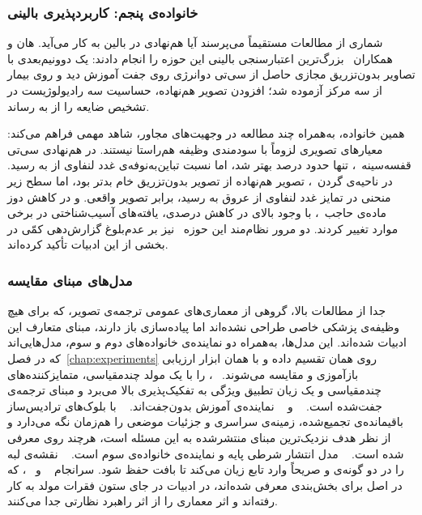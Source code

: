 \subsubsection*{خانواده‌ی پنجم: کاربردپذیری بالینی}

شماری از مطالعات مستقیماً می‌پرسند آیا هم‌نهادی در بالین به کار می‌آید. هان و همکاران~\cite{Han24} بزرگ‌ترین اعتبارسنجی بالینی این حوزه را انجام دادند: یک  دوونیم‌بعدی با تصاویر بدون‌تزریق مجازی حاصل از سی‌تی دوانرژی روی  جفت آموزش دید و روی  بیمار از سه مرکز آزموده شد؛ افزودن تصویر هم‌نهاده، حساسیت سه رادیولوژیست در تشخیص ضایعه را از  به  رساند.

همین خانواده، به‌همراه چند مطالعه در وجهیت‌های مجاور، شاهد مهمی فراهم می‌کند: معیارهای تصویری لزوماً با سودمندی وظیفه هم‌راستا نیستند. در هم‌نهادی سی‌تی قفسه‌سینه~\cite{Cho21}،  تنها حدود  درصد بهتر شد، اما نسبت تباین‌به‌نوفه‌ی غدد لنفاوی از  به  رسید. در ناحیه‌ی گردن~\cite{Fuk24}،  تصویر هم‌نهاده از تصویر بدون‌تزریق خام بدتر بود، اما سطح زیر منحنی در تمایز غدد لنفاوی از عروق به  رسید، برابر تصویر واقعی. و در کاهش دوز ماده‌ی حاجب~\cite{Hau21}، با وجود  بالای  در کاهش  درصدی، یافته‌های آسیب‌شناختی در برخی موارد تغییر کردند. دو مرور نظام‌مند این حوزه~\cite{Aza23,Jo26} نیز بر عدم‌بلوغ گزارش‌دهی کمّی در بخشی از این ادبیات تأکید کرده‌اند.


\subsubsection*{مدل‌های مبنای مقایسه}

جدا از مطالعات بالا، گروهی از معماری‌های عمومی ترجمه‌ی تصویر، که برای هیچ وظیفه‌ی پزشکی خاصی طراحی نشده‌اند اما پیاده‌سازی باز دارند، مبنای متعارف این ادبیات شده‌اند. این مدل‌ها، به‌همراه دو نماینده‌ی خانواده‌های دوم و سوم، مدل‌هایی‌اند که در فصل~\ref{chap:experiments} روی همان تقسیم داده و با همان ابزار ارزیابی بازآموزی و مقایسه می‌شوند. ~\cite{wang2018pix2pixhd}،  را با یک مولد چندمقیاسی، متمایزکننده‌های چندمقیاسی و یک زیان تطبیق ویژگی به تفکیک‌پذیری بالا می‌برد و مبنای ترجمه‌ی جفت‌شده است. ~\cite{zhu2017unpaired} و ~\cite{Ris21} نماینده‌ی آموزش بدون‌جفت‌اند. ~\cite{dalmaz2022resvit} با بلوک‌های ترادیس‌ساز باقیمانده‌ی تجمیع‌شده، زمینه‌ی سراسری و جزئیات موضعی را هم‌زمان نگه می‌دارد و از نظر هدف نزدیک‌ترین مبنای منتشرشده به این مسئله است، هرچند روی  معرفی شده است. ~\cite{ho2020denoising} مدل انتشار شرطی پایه و نماینده‌ی خانواده‌ی سوم است. ~\cite{yu2019eagans} نقشه‌ی لبه را در دو گونه‌ی  و  صریحاً وارد تابع زیان می‌کند تا بافت حفظ شود. سرانجام ~\cite{hatamizadeh2022swinunetr} و ~\cite{chen2021transunet}، که در اصل برای بخش‌بندی معرفی شده‌اند، در ادبیات در جای ستون فقرات مولد به کار رفته‌اند و اثر معماری را از اثر راهبرد نظارتی جدا می‌کنند.

